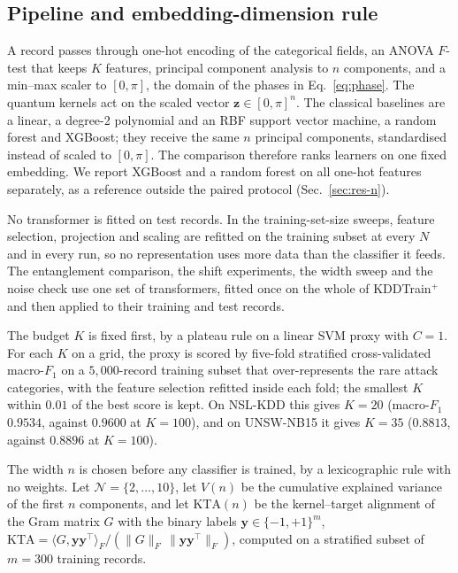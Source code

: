 \subsection{Pipeline and embedding-dimension rule}\label{sec:pipeline}

A record passes through one-hot encoding of the categorical fields, an ANOVA $F$-test that
keeps $K$ features, principal component analysis to $n$ components, and a min--max scaler to
$[0,\pi]$, the domain of the phases in Eq.~\eqref{eq:phase}. The quantum kernels act on the
scaled vector $\bm{z}\in[0,\pi]^n$. The classical baselines are a linear, a degree-2
polynomial and an RBF support vector machine, a random forest and XGBoost; they receive the same
$n$ principal components, standardised instead of scaled to $[0,\pi]$. The comparison therefore
ranks learners on one fixed embedding. We report XGBoost and a random forest on all one-hot
features separately, as a reference outside the paired protocol (Sec.~\ref{sec:res-n}).

No transformer is fitted on test records. In the training-set-size sweeps, feature selection,
projection and scaling are refitted on the training subset at every $N$ and in every run, so no
representation uses more data than the classifier it feeds. The entanglement comparison, the
shift experiments, the width sweep and the noise check use one set of transformers, fitted once
on the whole of KDDTrain$^+$ and then applied to their training and test records.

The budget $K$ is fixed first, by a plateau rule on a linear SVM proxy with $C=1$. For each $K$
on a grid, the proxy is scored by five-fold stratified cross-validated macro-$F_1$ on a
$5{,}000$-record training subset that over-represents the rare attack categories, with the
feature selection refitted inside each fold; the smallest $K$ within $0.01$ of the best score is
kept. On NSL-KDD this gives $K=20$ (macro-$F_1$ $0.9534$, against $0.9600$ at $K=100$), and on
UNSW-NB15 it gives $K=35$ ($0.8813$, against $0.8896$ at $K=100$).

The width $n$ is chosen before any classifier is trained, by a lexicographic rule with no
weights. Let $\mathcal{N}=\{2,\dots,10\}$, let $V(n)$ be the cumulative explained variance of
the first $n$ components, and let $\mathrm{KTA}(n)$ be the kernel--target alignment
\cite{cristianini2002} of the \ZZ{} Gram matrix $G$ with the binary labels
$\bm{y}\in\{-1,+1\}^m$,
$\mathrm{KTA}=\langle G,\bm{y}\bm{y}^{\top}\rangle_F/(\|G\|_F\,\|\bm{y}\bm{y}^{\top}\|_F)$,
computed on a stratified subset of $m=300$ training records.

